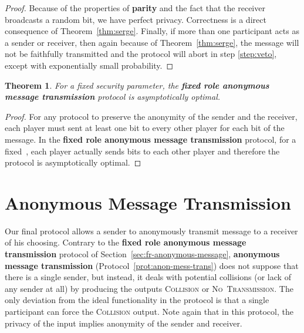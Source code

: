 \documentclass[11pt]{article}
\newtheorem{theorem}{Theorem}[section]
\begin{document}
\begin{proof}
Because of the properties of \textbf{parity} and the fact that the
receiver broadcasts a random bit, we have perfect privacy.
Correctness is a direct consequence of Theorem~\ref{thm:serge}.
Finally, if more than one participant acts as a sender or
receiver, then again because of Theorem~\ref{thm:serge}, the message
will not be faithfully transmitted and the protocol will abort in
step \ref{step:veto}, except with  exponentially small probability.
\end{proof}

\begin{theorem} \label{thm:optimal}
For a fixed security parameter, the \textbf{fixed role anonymous
message transmission} protocol is asymptotically optimal.
\end{theorem}

\begin{proof}
For any protocol to preserve the anonymity of the sender and the
receiver,  each player must sent at least one bit to every other
player for each bit of the message. In the  \textbf{fixed role
anonymous message transmission} protocol, for a fixed~,  each
player actually sends  bits to each other player and therefore
the protocol is asymptotically optimal.
\end{proof}


\section{Anonymous Message Transmission}
\label{sec:anonymous-message}


Our final protocol allows a sender to anonymously transmit
message to a receiver of his choosing. Contrary to  the
\textbf{fixed role anonymous message transmission} protocol of
Section~\ref{sec:fr-anonymous-message}, \textbf{anonymous message
transmission} (Protocol~\ref{prot:anon-mess-trans}) does not suppose
that there is a single sender, but instead, it deals with potential
collisions (or lack of any sender at all) by producing the outputs
\textsc{Collision} or \textsc{No~Transmission}. The only deviation
from the ideal functionality in the  protocol is that a single
participant can force the \textsc{Collision} output. Note again that
in this protocol, the privacy of the input implies anonymity of the
sender and receiver.
\end{document}

